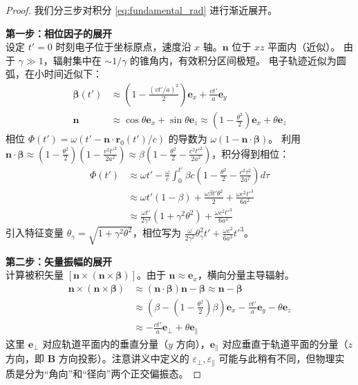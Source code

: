 \begin{proof}
    我们分三步对积分 \eqref{eq:fundamental_rad} 进行渐近展开。

    \textbf{第一步：相位因子的展开} \\
    设定 $t'=0$ 时刻电子位于坐标原点，速度沿 $x$ 轴。$\mathbf{n}$ 位于 $xz$ 平面内（近似）。
    由于 $\gamma \gg 1$，辐射集中在 $\sim 1/\gamma$ 的锥角内，有效积分区间极短。
    电子轨迹近似为圆弧，在小时间近似下：
    \begin{align}
        \boldsymbol{\beta}(t') &\approx \left(1 - \frac{(vt'/a)^2}{2}\right)\mathbf{e}_x + \frac{vt'}{a}\mathbf{e}_y \\
        \mathbf{n} &\approx \cos\theta \mathbf{e}_x + \sin\theta \mathbf{e}_z \approx \left(1-\frac{\theta^2}{2}\right)\mathbf{e}_x + \theta \mathbf{e}_z
    \end{align}
    相位 $\Phi(t') = \omega(t' - \mathbf{n}\cdot\mathbf{r}_0(t')/c)$ 的导数为 $\omega(1 - \mathbf{n}\cdot\boldsymbol{\beta})$。
    利用 $\mathbf{n}\cdot\boldsymbol{\beta} \approx (1-\frac{\theta^2}{2})(1-\frac{v^2 t'^2}{2a^2}) \approx \beta (1 - \frac{\theta^2}{2} - \frac{c^2 t'^2}{2a^2})$，积分得到相位：
    \begin{align}
        \Phi(t') &\approx \omega t' - \frac{\omega}{c} \int_0^{t'} \beta c \left( 1 - \frac{\theta^2}{2} - \frac{c^2 \tau^2}{2a^2} \right) d\tau \nonumber \\
        &\approx \omega t' (1-\beta) + \frac{\omega \beta t' \theta^2}{2} + \frac{\omega c^2 t'^3}{6a^2} \nonumber \\
        &\approx \frac{\omega t'}{2\gamma^2} (1 + \gamma^2 \theta^2) + \frac{\omega c^2 t'^3}{6a^2}
    \end{align}
    引入特征变量 $\theta_\gamma = \sqrt{1+\gamma^2\theta^2}$，相位写为 $\frac{\omega}{2\gamma^2} \theta_\gamma^2 t' + \frac{\omega c^2}{6a^2} t'^3$。

    \textbf{第二步：矢量振幅的展开} \\
    计算被积矢量 $[\mathbf{n} \times (\mathbf{n} \times \boldsymbol{\beta})]$。由于 $\mathbf{n} \approx \mathbf{e}_x$，横向分量主导辐射。
    \begin{align}
        \mathbf{n} \times (\mathbf{n} \times \boldsymbol{\beta}) &\approx (\mathbf{n}\cdot\boldsymbol{\beta})\mathbf{n} - \boldsymbol{\beta} \approx \mathbf{n} - \boldsymbol{\beta} \nonumber \\
        &\approx \left( \beta - \left(1-\frac{\theta^2}{2}\right) \beta \right) \mathbf{e}_x - \frac{vt'}{a}\mathbf{e}_y - \theta \mathbf{e}_z \nonumber \\
        &\approx -\frac{ct'}{a} \mathbf{e}_\perp + \theta \mathbf{e}_\parallel
    \end{align}
    这里 $\mathbf{e}_\perp$ 对应轨道平面内的垂直分量（$y$ 方向），$\mathbf{e}_\parallel$ 对应垂直于轨道平面的分量（$z$ 方向，即 $\mathbf{B}$ 方向投影）。注意讲义中定义的 $\varepsilon_\perp, \varepsilon_\parallel$ 可能与此稍有不同，但物理实质是分为“角向”和“径向”两个正交偏振态。


\end{proof}
